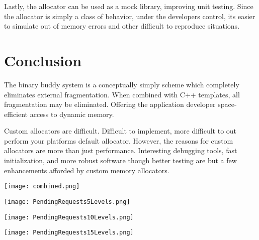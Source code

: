 \documentclass[12pt]{article}
\begin{document}
Lastly, the allocator can be used as a mock library, improving unit testing.
Since the allocator is simply a class of behavior, under the developers control,
its easier to simulate out of memory errors and other difficult to reproduce
situations.  

\section{Conclusion}
The binary buddy system is a conceptually simply scheme which completely
eliminates external fragmentation.  When combined with C++ templates, all
fragmentation may be eliminated.  Offering the application developer 
space-efficient access to dynamic memory.

Custom allocators are difficult. Difficult to implement, more difficult to out
perform your platforms default allocator. However, the reasons for custom
allocators are more than just performance.  Interesting debugging tools, fast
initialization, and more robust software though better testing are but a few
enhancements afforded by custom memory allocators. 





\begin{figure*}
    \begin{center}
        \texttt{[image: combined.png]}
        \label{fig:combinedlevels}
        \caption{}
    \end{center}
\end{figure*}


\begin{figure*}
    \begin{center}
        \texttt{[image: PendingRequests5Levels.png]}
        \label{fig:level5}
        \caption{}
    \end{center}
\end{figure*}


\begin{figure*}
    \begin{center}
        \texttt{[image: PendingRequests10Levels.png]}
        \label{fig:level10}
        \caption{}
    \end{center}
\end{figure*}


\begin{figure*}
    \begin{center}
        \texttt{[image: PendingRequests15Levels.png]}
        \label{fig:level15}
        \caption{}
    \end{center}
\end{figure*}
\end{document}
